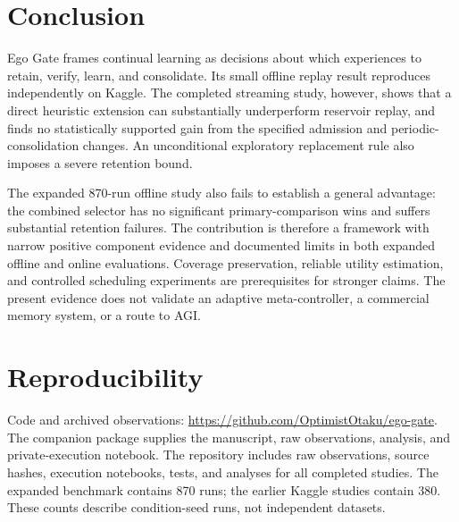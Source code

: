 \documentclass[conference]{IEEEtran}
\begin{document}
\section{Conclusion}
Ego Gate frames continual learning as decisions about which experiences to retain, verify, learn, and consolidate. Its small offline replay result reproduces independently on Kaggle. The completed streaming study, however, shows that a direct heuristic extension can substantially underperform reservoir replay, and finds no statistically supported gain from the specified admission and periodic-consolidation changes. An unconditional exploratory replacement rule also imposes a severe retention bound.

The expanded 870-run offline study also fails to establish a general advantage: the combined selector has no significant primary-comparison wins and suffers substantial retention failures. The contribution is therefore a framework with narrow positive component evidence and documented limits in both expanded offline and online evaluations. Coverage preservation, reliable utility estimation, and controlled scheduling experiments are prerequisites for stronger claims. The present evidence does not validate an adaptive meta-controller, a commercial memory system, or a route to AGI.

\section*{Reproducibility}
Code and archived observations: \url{https://github.com/OptimistOtaku/ego-gate}. The companion package supplies the manuscript, raw observations, analysis, and private-execution notebook. The repository includes raw observations, source hashes, execution notebooks, tests, and analyses for all completed studies. The expanded benchmark contains 870 runs; the earlier Kaggle studies contain 380. These counts describe condition-seed runs, not independent datasets.
\end{document}
